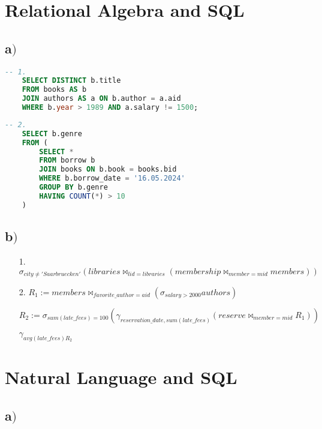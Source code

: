 



\section{ Relational Algebra and SQL}	

\subsection{a$)$}

\begin{lstlisting}[language=SQL]
	-- 1.
	SELECT DISTINCT b.title
	FROM books AS b
	JOIN authors AS a ON b.author = a.aid
	WHERE b.year > 1989 AND a.salary != 1500;
\end{lstlisting}

\begin{lstlisting}[language=SQL]
	-- 2.
	SELECT b.genre
	FROM (
		SELECT *
		FROM borrow b
		JOIN books ON b.book = books.bid
		WHERE b.borrow_date = '16.05.2024'
		GROUP BY b.genre
		HAVING COUNT(*) > 10
	)
\end{lstlisting}

\subsection{b$)$}

\begin{itemize}
	\item[1.] ${\sigma_{city \neq 'Saarbruecken'}(libraries {\Join}_{lid = libraries} (membership {\Join}_{member = mid} members))}$
	\item[2.] $R_1 := members {\Join}_{favorite\_author=aid} ({\sigma}_{salary > 2000} authors)$
	
			  $R_2 := {\sigma}_{sum(late\_fees) = 100} ({\gamma}_{reservation\_date, sum(late\_fees)} (reserve {\Join}_{member = mid} R_1))$
			  
			  ${\gamma}_{avg(late\_fees) R_2}$
		
\end{itemize}
	
\section{Natural Language and SQL}	

\subsection{a$)$}

